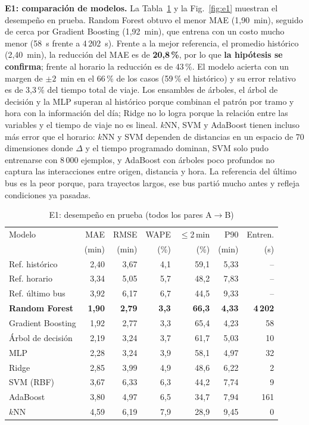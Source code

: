 \documentclass[conference,a4paper]{IEEEtran}
\begin{document}
\textbf{E1: comparación de modelos.} La Tabla~\ref{tab:e1} y la Fig.~\ref{fig:e1} muestran el desempeño en prueba. Random Forest obtuvo el menor MAE (1,90~min), seguido de cerca por Gradient Boosting (1,92~min), que entrena con un costo mucho menor (58~s frente a 4\,202~s). Frente a la mejor referencia, el promedio histórico (2,40~min), la reducción del MAE es de \textbf{20,8\,\%}, por lo que \textbf{la hipótesis se confirma}; frente al horario la reducción es de 43\,\%. El modelo acierta con un margen de $\pm 2$~min en el 66\,\% de los casos (59\,\% el histórico) y su error relativo es de 3,3\,\% del tiempo total de viaje. Los ensambles de árboles, el árbol de decisión y la MLP superan al histórico porque combinan el patrón por tramo y hora con la información del día; Ridge no lo logra porque la relación entre las variables y el tiempo de viaje no es lineal. $k$NN, SVM y AdaBoost tienen incluso más error que el horario: $k$NN y SVM dependen de distancias en un espacio de 70 dimensiones donde $\Delta$ y el tiempo programado dominan, SVM solo pudo entrenarse con 8\,000 ejemplos, y AdaBoost con árboles poco profundos no captura las interacciones entre origen, distancia y hora. La referencia del último bus es la peor porque, para trayectos largos, ese bus partió mucho antes y refleja condiciones ya pasadas.

\begin{table}[t]
\centering
\caption{E1: desempeño en prueba (todos los pares A$\to$B)}
\label{tab:e1}
\footnotesize
\setlength{\tabcolsep}{3.5pt}
\begin{tabular}{@{}lrrrrrr@{}}
\toprule
Modelo & MAE & RMSE & WAPE & $\le$2\,min & P90 & Entren. \\
 & (min) & (min) & (\%) & (\%) & (min) & (s) \\
\midrule
Ref. histórico & 2,40 & 3,67 & 4,1 & 59,1 & 5,33 & -- \\
Ref. horario & 3,34 & 5,05 & 5,7 & 48,2 & 7,83 & -- \\
Ref. último bus & 3,92 & 6,17 & 6,7 & 44,5 & 9,33 & -- \\
\midrule
\textbf{Random Forest} & \textbf{1,90} & \textbf{2,79} & \textbf{3,3} & \textbf{66,3} & \textbf{4,33} & \textbf{4\,202} \\
Gradient Boosting & 1,92 & 2,77 & 3,3 & 65,4 & 4,23 & 58 \\
Árbol de decisión & 2,19 & 3,24 & 3,7 & 61,7 & 5,03 & 10 \\
MLP & 2,28 & 3,24 & 3,9 & 58,1 & 4,97 & 32 \\
Ridge & 2,85 & 3,99 & 4,9 & 48,6 & 6,22 & 2 \\
SVM (RBF) & 3,67 & 6,33 & 6,3 & 44,2 & 7,74 & 9 \\
AdaBoost & 3,80 & 4,97 & 6,5 & 34,7 & 7,94 & 161 \\
$k$NN & 4,59 & 6,19 & 7,9 & 28,9 & 9,45 & 0 \\
\bottomrule
\end{tabular}
\end{table}
\end{document}
